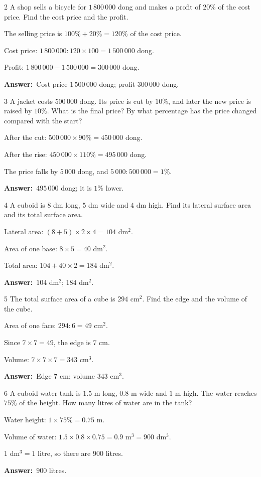\documentclass[11pt]{article}
\newif\ifsol \solfalse
\providecommand{\AnsWord}{Đáp số}
\newcommand{\dapso}[1]{\par\textbf{\AnsWord:}\ #1}
\newcommand{\probsol}[1]{%
  \begin{lrbox}{\solmeasure}\begin{minipage}{\dimexpr\linewidth-24pt\relax}#1\end{minipage}\end{lrbox}%
  \ifsol
    \begin{solbox}#1\end{solbox}%
  \else
    \setlength{\solht}{\dimexpr\ht\solmeasure+\dp\solmeasure+0.85cm\relax}%
    \ifdim\solht<1.35cm\setlength{\solht}{1.35cm}\fi
    \begin{tcolorbox}[colback=white,colframe=Line,boxrule=0.8pt,arc=5pt,
      left=8pt,right=8pt,top=4pt,bottom=4pt,height=\solht]{\footnotesize\color{Slate}\itshape\WorkWord}\end{tcolorbox}%
  \fi}
\newcommand{\gap}{\vspace{0.3cm}}
\def\WorkWord{Your work:}
\def\AnsWord{Answer}
\begin{document}
\gap
\begin{probbox}{2}{\relax}
A shop sells a bicycle for $1\,800\,000$ dong and makes a profit of $20\%$ of the cost price. Find the cost price and the profit.
\end{probbox}
\probsol{
The selling price is $100\%+20\%=120\%$ of the cost price.\par
Cost price: $1\,800\,000:120\times100=1\,500\,000$ dong.\par
Profit: $1\,800\,000-1\,500\,000=300\,000$ dong.
\dapso{Cost price $1\,500\,000$ dong; profit $300\,000$ dong.}}
\gap
\begin{probbox}{3}{\relax}
A jacket costs $500\,000$ dong. Its price is cut by $10\%$, and later the new price is raised by $10\%$. What is the final price? By what percentage has the price changed compared with the start?
\end{probbox}
\probsol{
After the cut: $500\,000\times90\%=450\,000$ dong.\par
After the rise: $450\,000\times110\%=495\,000$ dong.\par
The price falls by $5\,000$ dong, and $5\,000:500\,000=1\%$.
\dapso{$495\,000$ dong; it is $1\%$ lower.}}
\gap
\begin{probbox}{4}{\relax}
A cuboid is $8$ dm long, $5$ dm wide and $4$ dm high. Find its lateral surface area and its total surface area.
\end{probbox}
\probsol{
Lateral area: $(8+5)\times2\times4=104$ dm$^2$.\par
Area of one base: $8\times5=40$ dm$^2$.\par
Total area: $104+40\times2=184$ dm$^2$.
\dapso{$104$ dm$^2$; $184$ dm$^2$.}}
\gap
\begin{probbox}{5}{\relax}
The total surface area of a cube is $294$ cm$^2$. Find the edge and the volume of the cube.
\end{probbox}
\probsol{
Area of one face: $294:6=49$ cm$^2$.\par
Since $7\times7=49$, the edge is $7$ cm.\par
Volume: $7\times7\times7=343$ cm$^3$.
\dapso{Edge $7$ cm; volume $343$ cm$^3$.}}
\gap
\begin{probbox}{6}{\relax}
A cuboid water tank is $1.5$ m long, $0.8$ m wide and $1$ m high. The water reaches $75\%$ of the height. How many litres of water are in the tank?
\end{probbox}
\probsol{
Water height: $1\times75\%=0.75$ m.\par
Volume of water: $1.5\times0.8\times0.75=0.9$ m$^3=900$ dm$^3$.\par
$1$ dm$^3=1$ litre, so there are $900$ litres.
\dapso{$900$ litres.}}
\end{document}
